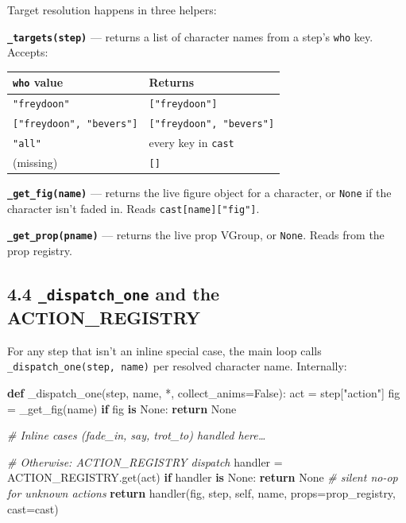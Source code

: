\documentclass[
  11pt,
]{book}
\newenvironment{Shaded}{}{}
\newcommand{\CommentTok}[1]{\textcolor[rgb]{0.38,0.63,0.69}{\textit{#1}}}
\newcommand{\ControlFlowTok}[1]{\textcolor[rgb]{0.00,0.44,0.13}{\textbf{#1}}}
\newcommand{\KeywordTok}[1]{\textcolor[rgb]{0.00,0.44,0.13}{\textbf{#1}}}
\newcommand{\NormalTok}[1]{#1}
\newcommand{\OperatorTok}[1]{\textcolor[rgb]{0.40,0.40,0.40}{#1}}
\newcommand{\StringTok}[1]{\textcolor[rgb]{0.25,0.44,0.63}{#1}}
\newcommand{\VariableTok}[1]{\textcolor[rgb]{0.10,0.09,0.49}{#1}}
\begin{document}
Target resolution happens in three helpers:

\textbf{\texttt{\_targets(step)}} --- returns a list of character names
from a step's \texttt{who} key. Accepts:

\begin{longtable}[]{@{}ll@{}}
\toprule\noalign{}
\texttt{who} value & Returns \\
\midrule\noalign{}
\endhead
\bottomrule\noalign{}
\endlastfoot
\texttt{"freydoon"} & \texttt{{[}"freydoon"{]}} \\
\texttt{{[}"freydoon",\ "bevers"{]}} &
\texttt{{[}"freydoon",\ "bevers"{]}} \\
\texttt{"all"} & every key in \texttt{cast} \\
(missing) & \texttt{{[}{]}} \\
\end{longtable}

\textbf{\texttt{\_get\_fig(name)}} --- returns the live figure object
for a character, or \texttt{None} if the character isn't faded in. Reads
\texttt{cast{[}name{]}{[}"fig"{]}}.

\textbf{\texttt{\_get\_prop(pname)}} --- returns the live prop VGroup,
or \texttt{None}. Reads from the prop registry.

\subsection{\texorpdfstring{4.4 \texttt{\_dispatch\_one} and the
ACTION\_REGISTRY}{4.4 \_dispatch\_one and the ACTION\_REGISTRY}}\label{dispatch_one-and-the-action_registry}

For any step that isn't an inline special case, the main loop calls
\texttt{\_dispatch\_one(step,\ name)} per resolved character name.
Internally:

\begin{Shaded}
\begin{Highlighting}[]
\KeywordTok{def}\NormalTok{ \_dispatch\_one(step, name, }\OperatorTok{*}\NormalTok{, collect\_anims}\OperatorTok{=}\VariableTok{False}\NormalTok{):}
\NormalTok{    act }\OperatorTok{=}\NormalTok{ step[}\StringTok{"action"}\NormalTok{]}
\NormalTok{    fig }\OperatorTok{=}\NormalTok{ \_get\_fig(name)}
    \ControlFlowTok{if}\NormalTok{ fig }\KeywordTok{is} \VariableTok{None}\NormalTok{:}
        \ControlFlowTok{return} \VariableTok{None}

    \CommentTok{\# Inline cases (fade\_in, say, trot\_to) handled here…}

    \CommentTok{\# Otherwise: ACTION\_REGISTRY dispatch}
\NormalTok{    handler }\OperatorTok{=}\NormalTok{ ACTION\_REGISTRY.get(act)}
    \ControlFlowTok{if}\NormalTok{ handler }\KeywordTok{is} \VariableTok{None}\NormalTok{:}
        \ControlFlowTok{return} \VariableTok{None}    \CommentTok{\# silent no{-}op for unknown actions}
    \ControlFlowTok{return}\NormalTok{ handler(fig, step, }\VariableTok{self}\NormalTok{, name,}
\NormalTok{                   props}\OperatorTok{=}\NormalTok{prop\_registry, cast}\OperatorTok{=}\NormalTok{cast)}
\end{Highlighting}
\end{Shaded}
\end{document}
